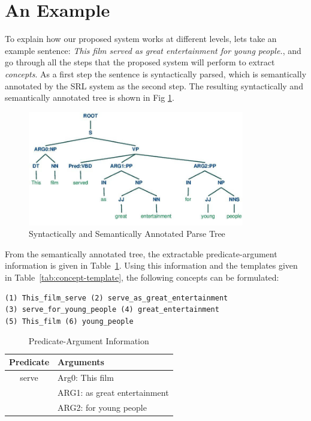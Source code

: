 \documentclass[runningheads,a4paper]{llncs}
\begin{document}
\section{An Example} 
To explain how our proposed system works at different levels, lets take an example sentence: \textit{This film served as great entertainment for young people.}, and go through all the steps that the proposed system will perform to extract \textit{concepts}. As a first step the sentence is syntactically parsed, which is semantically annotated by the SRL system as the second step. The resulting syntactically and semantically annotated tree is shown in Fig \ref{fig:parse-tree}.
\begin{figure}[!h]
\centering
\includegraphics[width=.8\textwidth,height=5cm]{parse-tree6.jpg}
\caption{Syntactically and Semantically Annotated Parse Tree}
\label{fig:parse-tree}
\end{figure} 
From the semantically annotated tree, the extractable predicate-argument information is given in Table~\ref{tab:pred-arg-info}. Using this information and the templates given in Table~\ref{tab:concept-template}, the following concepts can be formulated:
\begin{verbatim}
(1) This_film_serve (2) serve_as_great_entertainment
(3) serve_for_young_people (4) great_entertainment
(5) This_film (6) young_people
\end{verbatim}
\begin{table}[!h]
\centering
\begin{tabular}{cp{10cm}}
\hline Predicate &  Arguments\\ 
\hline serve  & Arg0: This film \\
 & ARG1: as great entertainment \\
 & ARG2: for young people \\
\hline 
\end{tabular} 
\caption{Predicate-Argument Information}
\label{tab:pred-arg-info}
\end{table}    
\end{document}
